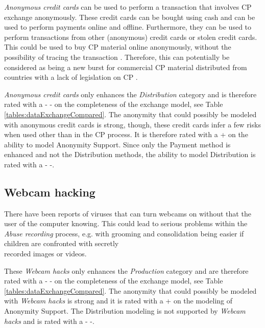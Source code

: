\documentclass{sig-alternate-br}
\begin{document}
\textit{Anonymous credit cards} can be used to perform a transaction that involves CP exchange anonymously. These credit cards can be bought using cash and can be used to perform payments online and offline. Furthermore, they can be used to perform transactions from other (anonymous) credit cards or stolen credit cards. This could be used to buy CP material online anonymously, without the possibility of tracing the transaction \cite{wall2007cybercrime}. Therefore, this can potentially be considered as being a new burst for commercial CP material distributed from countries with a lack of legislation on CP \cite{kierkegaard2008cybering}.

\textit{Anonymous credit cards} only enhances the \textit{Distribution} category and is therefore rated with a - - on the completeness of the exchange model, see Table \ref{tables:dataExchangeCompared}. The anonymity that could possibly be modeled with anonymous credit cards is strong, though, these credit cards infer a few risks when used other than in the CP process. It is therefore rated with a + on the ability to model Anonymity Support. Since only the Payment method is enhanced and not the Distribution methods, the ability to model Distribution is rated with a - -.

\subsection{Webcam hacking}
There have been reports \cite{mishna2009ongoing,salomon2010examples} of viruses that can turn webcams on without that the user of the computer knowing. This could lead to serious problems within the \textit{Abuse recording} process, e.g. with grooming and consolidation being easier if children are confronted with secretly\\ recorded images or videos. 

These \textit{Webcam hacks} only enhances the \textit{Production} category and are therefore rated with a - - on the completeness of the exchange model, see Table \ref{tables:dataExchangeCompared}. The anonymity that could possibly be modeled with \textit{Webcam hacks} is strong and it is rated with a + on the modeling of Anonymity Support. The Distribution modeling is not supported by \textit{Webcam hacks} and is rated with a - -.
\end{document}
